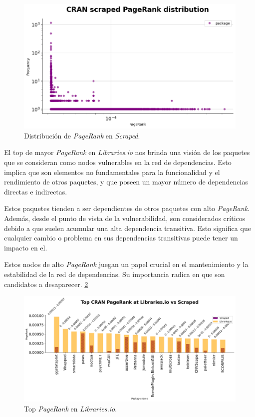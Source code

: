 \begin{figure}[ht!]
    \begin{center}
        \includegraphics[width=1\textwidth]{img/cran/pr2.png}
        \caption{Distribución de \textit{PageRank} en \textit{Scraped}.}
        \label{fig:cran_pr_scraped}
    \end{center}
\end{figure}

El top de mayor \textit{PageRank} en \textit{Libraries.io} nos brinda una visión de los paquetes que se
consideran como nodos vulnerables en la red de dependencias. Esto implica que son elementos no fundamentales
para la funcionalidad y el rendimiento de otros paquetes, y que poseen un mayor número de dependencias
directas e indirectas.

Estos paquetes tienden a ser dependientes de otros paquetes con alto \textit{PageRank}. Además, desde el
punto de vista de la vulnerabilidad, son considerados críticos debido a que suelen acumular una alta
dependencia transitiva. Esto significa que cualquier cambio o problema en sus dependencias transitivas puede
tener un impacto en el.

Estos nodos de alto \textit{PageRank} juegan un papel crucial en el mantenimiento y la estabilidad de la
red de dependencias. Su importancia radica en que son candidatos a desaparecer. \ref{fig:cran_pr_libio_top}

\begin{figure}[ht!]
    \begin{center}
        \includegraphics[width=1\textwidth]{img/cran/pr_top.png}
        \caption{Top \textit{PageRank} en \textit{Libraries.io}.}
        \label{fig:cran_pr_libio_top}
    \end{center}
\end{figure}


